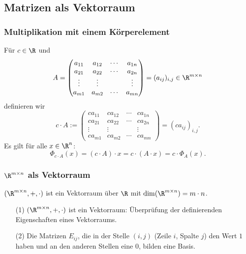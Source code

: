 \subsection{Matrizen als Vektorraum}
\makeSectionDividerPage
%
\begin{frame}\frametitle{Multiplikation mit einem Körperelement}

	Für $c\in\R$ und 
	$$
		A = 
			\begin{pmatrix}
				a_{11}	&a_{12}	&\cdots	&a_{1n}\\
				a_{21} 	&a_{22} 	&\cdots 	&a_{2n}\\
				\vdots 	&\vdots   	&            	&\vdots \\
				a_{m1} 	&a_{m2} 	&\cdots 	&a_{mn}
			\end{pmatrix}
			=(a_{ij})_{i,j}\in \R^{m\times n}
	$$
	definieren wir
	$$
		c\cdot A := 
			\begin{pmatrix}
				ca_{11}	&ca_{12}	&\cdots	&ca_{1n}\\
				ca_{21} 	&ca_{22} 	&\cdots 	&ca_{2n}\\
				\vdots 	&\vdots   	&            	&\vdots \\
				ca_{m1} 	&ca_{m2} 	&\cdots 	&ca_{mn}
			\end{pmatrix}
			=(ca_{ij})_{i,j}.
	$$
\pause
	Es gilt für alle $x\in \R^n$:
	$$
		\Phi_{c\cdot A}(x) = (c\cdot A)\cdot x = c\cdot(A\cdot x) = c\cdot \Phi_A(x). 
	$$
	
\end{frame}
%
%
\begin{frame}\frametitle{$\R^{m\times n}$ als Vektorraum}

	$(\R^{m\times n},+,\cdot)$ ist ein Vektorraum über $\R$ mit $\dim(\R^{m\times n}) = m\cdot n$.\\[10mm]
	
	\pause
	\begin{itemize}
		\item[(1)] $(\R^{m\times n},+,\cdot)$ ist ein Vektorraum: 
			\"Uberprüfung der definierenden Eigenschaften eines Vektorraums.\pause
		\item[(2)] Die Matrizen $E_{ij}$, die in der Stelle $(i,j)$ (Zeile $i$, Spalte $j$) den Wert $1$ haben 
			und an den anderen Stellen eine $0$, bilden eine Basis.
	\end{itemize}

\end{frame}
%

